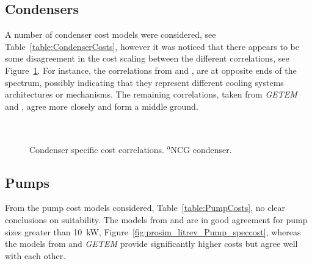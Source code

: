    \subsection{Condensers}

        A number of condenser cost models were considered, see Table~\ref{table:CondenserCosts}, however it was noticed that there appears to be some disagreement in the cost scaling between the different correlations, see Figure~\ref{fig:prosim_litrev_CondTHX_speccost}. For instance, the correlations from \citeauthor{Smith2005} \cite{Smith2005} and \citeauthor{Turton2012} \cite{Turton2012}, are at opposite ends of the spectrum, possibly indicating that they represent different cooling systems architectures or mechanisms. The remaining correlations, taken from \emph{GETEM} \cite{GETEM2016} and \citeauthor{Astolfi2014B} \cite{Astolfi2014B}, agree more closely and form a middle ground.
        
        \begin{table}[H]
            \caption[Cost correlations for condensers.]{Cost correlations for condensers.\(A\) is the heat transfer area in \unit{\square\m}. \textsuperscript{a}via \cite{Adams2021} \textsuperscript{b}\ac{NCG} condenser }
            \centering 
            \label{table:CondenserCosts}
            \scalebox{0.8}{
                
            }
            \\[10pt]
        \end{table}


        \begin{figure}[H]
            \centering
            
            \caption[Condenser specific cost correlations.]{Condenser specific cost correlations. \textsuperscript{a}\ac{NCG} condenser.}
            \label{fig:prosim_litrev_CondTHX_speccost}
        \end{figure}
        
    \subsection{Pumps}
        From the pump cost models considered, Table~\ref{table:PumpCosts}, no clear conclusions on suitability. The models from \citeauthor{Turton2012} \cite{Turton2012} and \citeauthor{Astolfi2014B} \cite{Astolfi2014B} are in good agreement for pump sizes greater than \qty{10}{\kilo\watt}, Figure~\ref{fig:prosim_litrev_Pump_speccost}, whereas the models from \citeauthor{Smith2005} \cite{Smith2005} and \emph{GETEM} \cite{GETEM2016} provide significantly higher costs but agree well with each other.
        

